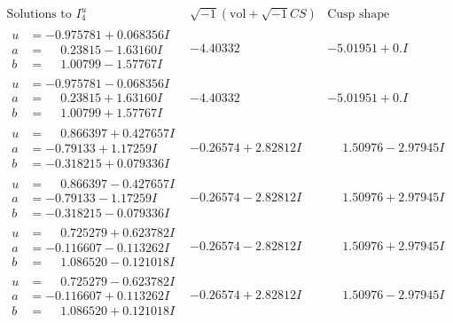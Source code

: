 \documentclass[1p]{elsarticle_modified}
\theoremstyle{definition}
\newcommand{\I}{\sqrt{-1}}
\begin{document}
$$\begin{array}{c|c|c}  
\text{Solutions to }I^u_{4}& \I (\text{vol} + \sqrt{-1}CS) & \text{Cusp shape}\\
 \hline 
\begin{aligned}
u &= -0.975781 + 0.068356 I \\
a &= \phantom{-}0.23815 - 1.63160 I \\
b &= \phantom{-}1.00799 - 1.57767 I\end{aligned}
 & -4.40332\phantom{ +0.000000I} & -5.01951 + 0. I\phantom{ +0.000000I} \\ \hline\begin{aligned}
u &= -0.975781 - 0.068356 I \\
a &= \phantom{-}0.23815 + 1.63160 I \\
b &= \phantom{-}1.00799 + 1.57767 I\end{aligned}
 & -4.40332\phantom{ +0.000000I} & -5.01951 + 0. I\phantom{ +0.000000I} \\ \hline\begin{aligned}
u &= \phantom{-}0.866397 + 0.427657 I \\
a &= -0.79133 + 1.17259 I \\
b &= -0.318215 + 0.079336 I\end{aligned}
 & -0.26574 + 2.82812 I & \phantom{-}1.50976 - 2.97945 I \\ \hline\begin{aligned}
u &= \phantom{-}0.866397 - 0.427657 I \\
a &= -0.79133 - 1.17259 I \\
b &= -0.318215 - 0.079336 I\end{aligned}
 & -0.26574 - 2.82812 I & \phantom{-}1.50976 + 2.97945 I \\ \hline\begin{aligned}
u &= \phantom{-}0.725279 + 0.623782 I \\
a &= -0.116607 - 0.113262 I \\
b &= \phantom{-}1.086520 - 0.121018 I\end{aligned}
 & -0.26574 - 2.82812 I & \phantom{-}1.50976 + 2.97945 I \\ \hline\begin{aligned}
u &= \phantom{-}0.725279 - 0.623782 I \\
a &= -0.116607 + 0.113262 I \\
b &= \phantom{-}1.086520 + 0.121018 I\end{aligned}
 & -0.26574 + 2.82812 I & \phantom{-}1.50976 - 2.97945 I \\ \hline\begin{aligned}

\end{aligned}
\end{array}$$
\end{document}
